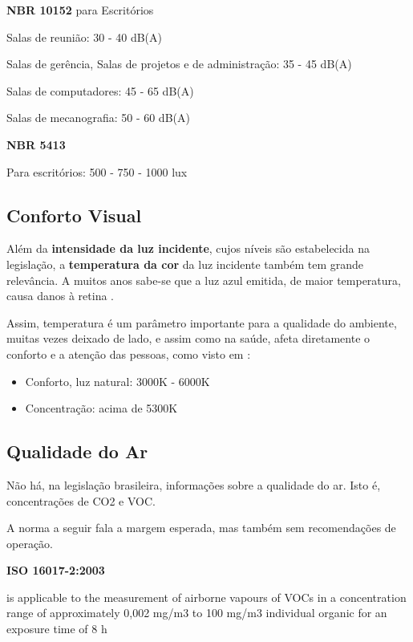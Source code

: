 \documentclass[monografia.tex]{subfiles}
\begin{document}
\begin{citacaoLonga} %

\textbf{NBR 10152} \cite{NBR10152} para Escritórios

Salas de reunião: 30 - 40 dB(A)

Salas de gerência, Salas de projetos e de administração: 35 - 45 dB(A)

Salas de computadores: 45 - 65 dB(A)

Salas de mecanografia: 50 - 60 dB(A)

\textbf{NBR 5413} \cite{NBR5413}

Para escritórios: 500 - 750 - 1000 lux
\end{citacaoLonga}

\subsection{Conforto Visual} %
Além da \textbf{intensidade da luz incidente}, cujos níveis são estabelecida na legislação, a \textbf{temperatura da cor} da luz incidente também tem grande relevância. A muitos anos sabe-se que a luz azul emitida, de maior temperatura, causa danos à retina \cite{BlueLight}. \par
Assim, temperatura é um parâmetro importante para a qualidade do ambiente, muitas vezes deixado de lado, e assim como na saúde, afeta diretamente o conforto e a atenção das pessoas, como visto em \cite{VisualComfort}: 
\begin{itemize}
\item Conforto, luz natural: 3000K - 6000K
\item Concentração: acima de 5300K 
\end{itemize}

\subsection{Qualidade do Ar} %

Não há, na legislação brasileira, informações sobre a qualidade do ar. Isto é, concentrações de CO2 e VOC. 

A norma a seguir fala a margem esperada, mas também sem recomendações de operação. 

\begin{citacaoLonga} %
\textbf{ISO 16017-2:2003}

is applicable to the measurement of airborne vapours of VOCs in a concentration range of approximately 0,002 mg/m3 to 100 mg/m3 individual organic for an exposure time of 8 h
\end{citacaoLonga}
\end{document}
